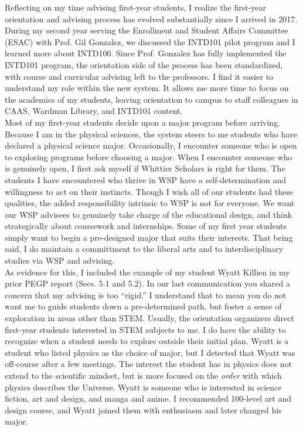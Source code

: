 \documentclass[../../main.tex]{subfiles}
\begin{document}
Reflecting on my time advising first-year students, I realize the first-year orientation and advising process has evolved substantially since I arrived in 2017.  During my second year serving the Enrollment and Student Affairs Committee (ESAC) with Prof. Gil Gonzalez, we discussed the INTD101 pilot program and I learned more about INTD100.  Since Prof. Gonzalez has fully implemented the INTD101 program, the orientation side of the process has been standardized, with course and curricular advising left to the professors.  I find it easier to understand my role within the new system.  It allows me more time to focus on the academics of my students, leaving orientation to campus to staff colleagues in CAAS, Wardman Library, and INTD101 content.  
\\
\vspace{0.25cm}
Most of my first-year students decide upon a major program before arriving.  Because I am in the physical sciences, the system steers to me students who have declared a physical science major.  Occasionally, I encounter someone who is open to exploring programs before choosing a major.  When I encounter someone who is genuinely open, I first ask myself if Whittier Scholars is right for them.  The students I have encountered who thrive in WSP have a self-determination and willingness to act on their instincts.  Though I wish all of our students had these qualities, the added responsibility intrinsic to WSP is not for everyone.  We want our WSP advisees to genuinely take charge of the educational design, and think strategically about coursework and internships.  Some of my first year students simply want to begin a pre-designed major that suits their interests.  That being said, I do maintain a committment to the liberal arts and to interdisciplinary studies via WSP and advising.
\\
\vspace{0.25cm}
As evidence for this, I included the example of my student Wyatt Killien in my prior PEGP report (Secs. 5.1 and 5.2).  In our last communication you shared a concern that my advising is too ``rigid.''  I understand that to mean you do not want me to guide students down a pre-determined path, but foster a sense of exploration in areas other than STEM.  Usually, the orientation organizers direct first-year students interested in STEM subjects to me.  I do have the ability to recognize when a student needs to explore outside their initial plan.  Wyatt is a student who listed physics as the choice of major, but I detected that Wyatt was off-course after a few meetings.  The interest the student has in physics does not extend to the scientific mindset, but is more focused on the \textit{order} with which physics describes the Universe.  Wyatt is someone who is interested in science fiction, art and design, and manga and anime.  I recommended 100-level art and design course, and Wyatt joined them with enthusiasm and later changed his major.
\end{document}

